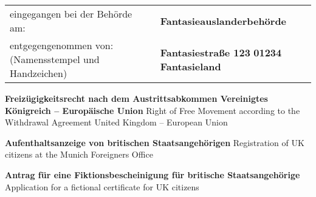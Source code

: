 \documentclass[a4paper]{article}
\newcommand{\AuslanderbehoerdeDescription}{Fantasieauslanderbehörde}
\newcommand{\AuslanderbehoerdeAddressLineOne}{Fantasiestraße 123}
\newcommand{\AuslanderbehoerdeAddressLineTwo}{01234 Fantasieland}
\begin{document}
    \begin{tabularx}{\textwidth}{@{\extracolsep{\fill}}XX}
        eingegangen bei der Behörde am: \hrulefill & 
            \textbf{\AuslanderbehoerdeDescription} \\
        entgegengenommen von: \hrulefill
            \newline
            (Namensstempel und Handzeichen) &    
            \textbf{\AuslanderbehoerdeAddressLineOne}
            \newline 
            \textbf{\AuslanderbehoerdeAddressLineTwo} \\
    \end{tabularx}
    \vspace{1cm}
    
    \textbf{Freizügigkeitsrecht
    nach dem Austrittsabkommen Vereinigtes Königreich – Europäische Union}
    \newline
    Right of Free Movement according to the Withdrawal Agreement United Kingdom – European Union

    \vspace{1cm}

    \begin{itemize}
        \textbf{Aufenthaltsanzeige von britischen Staatsangehörigen}
        \newline
        Registration of UK citizens at the Munich Foreigners Office 
    \end{itemize} 
    \begin{itemize}
        \textbf{Antrag für eine Fiktionsbescheinigung für britische Staatsangehörige}
        \newline
        Application for a fictional certificate for UK citizens
    \end{itemize}
    \vspace{1cm}
\end{document}
